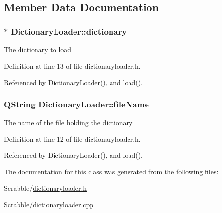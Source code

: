 \subsection{Member Data Documentation}
\hypertarget{class_dictionary_loader_a8c072c045354452eb8a5d34f5936518a}{
\subsubsection[{dictionary}]{$\ast$ Dictionary\-Loader\-::dictionary\hspace{0.3cm}{\ttfamily [private]}}}\label{class_dictionary_loader_a8c072c045354452eb8a5d34f5936518a}
The dictionary to load 

Definition at line 13 of file dictionaryloader.\-h.



Referenced by Dictionary\-Loader(), and load().

\hypertarget{class_dictionary_loader_ae586d429ac12873cc443f0fa68fd81e7}{
\subsubsection[{file\-Name}]{\setlength{\rightskip}{0pt plus 5cm}Q\-String Dictionary\-Loader\-::file\-Name\hspace{0.3cm}{\ttfamily [private]}}}\label{class_dictionary_loader_ae586d429ac12873cc443f0fa68fd81e7}
The name of the file holding the dictionary 

Definition at line 12 of file dictionaryloader.\-h.



Referenced by Dictionary\-Loader(), and load().



The documentation for this class was generated from the following files\-:\begin{DoxyCompactItemize}
\item 
Scrabble/\hyperlink{dictionaryloader_8h}{dictionaryloader.\-h}\item 
Scrabble/\hyperlink{dictionaryloader_8cpp}{dictionaryloader.\-cpp}\end{DoxyCompactItemize}

